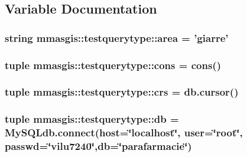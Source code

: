 \subsection{Variable Documentation}
\hypertarget{namespacemmasgis_1_1testquerytype_a2e593d719a194dc926a878eaa33846e1}{
\subsubsection[{area}]{\setlength{\rightskip}{0pt plus 5cm}string {\bf mmasgis::testquerytype::area} = 'giarre'}}
\label{namespacemmasgis_1_1testquerytype_a2e593d719a194dc926a878eaa33846e1}
\hypertarget{namespacemmasgis_1_1testquerytype_a0a6b3907a5d2aa5f9ed920af8ddee1f3}{
\subsubsection[{cons}]{\setlength{\rightskip}{0pt plus 5cm}tuple {\bf mmasgis::testquerytype::cons} = {\bf cons}()}}
\label{namespacemmasgis_1_1testquerytype_a0a6b3907a5d2aa5f9ed920af8ddee1f3}
\hypertarget{namespacemmasgis_1_1testquerytype_a55ad3e8b85eed65ed1b5353795fecbd3}{
\subsubsection[{crs}]{\setlength{\rightskip}{0pt plus 5cm}tuple {\bf mmasgis::testquerytype::crs} = db.cursor()}}
\label{namespacemmasgis_1_1testquerytype_a55ad3e8b85eed65ed1b5353795fecbd3}
\hypertarget{namespacemmasgis_1_1testquerytype_ab8ef45525ef14f1438ad57168a1419e7}{
\subsubsection[{db}]{\setlength{\rightskip}{0pt plus 5cm}tuple {\bf mmasgis::testquerytype::db} = MySQLdb.connect(host=\char`\"{}localhost\char`\"{}, user=\char`\"{}root\char`\"{}, passwd=\char`\"{}vilu7240\char`\"{},db=\char`\"{}parafarmacie\char`\"{})}}
\label{namespacemmasgis_1_1testquerytype_ab8ef45525ef14f1438ad57168a1419e7}
